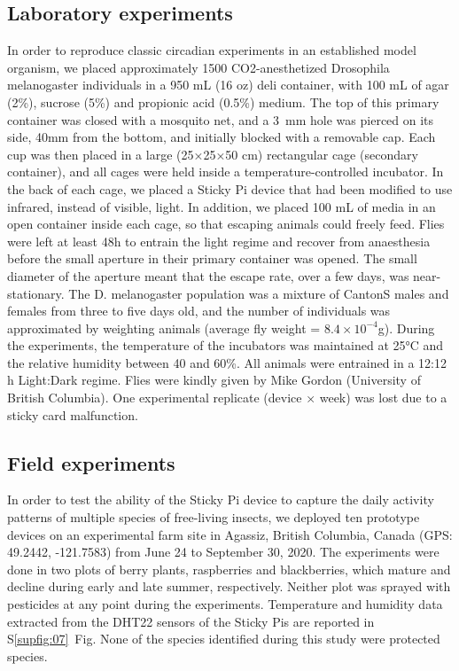 \documentclass[12pt]{article}
\begin{document}
\begin{linenumbers}
		\subsection*{Laboratory experiments}
		In order to reproduce classic circadian experiments in an established model organism, we placed approximately 1500 CO2-anesthetized Drosophila melanogaster individuals in a 950 mL (16 oz) deli container, with 100 mL of agar (2\%), sucrose (5\%) and propionic acid (0.5\%) medium. The top of this primary container was closed with a mosquito net, and a 3~mm hole was pierced on its side, 40mm from the bottom, and initially blocked with a removable cap. Each cup was then placed in a large (25×25×50 cm) rectangular cage (secondary container), and all cages were held inside a temperature-controlled incubator. In the back of each cage, we placed a Sticky Pi device that had been modified to use infrared, instead of visible, light. In addition, we placed 100 mL of media in an open container inside each cage, so that escaping animals could freely feed. Flies were left at least 48h to entrain the light regime and recover from anaesthesia before the small aperture in their primary container was opened. The small diameter of the aperture meant that the escape rate, over a few days, was near-stationary.
		The D. melanogaster population was a mixture of CantonS males and females from three to five days old, and the number of individuals was approximated by weighting animals (average fly weight = $8.4×10^{-4}$g). During the experiments, the temperature of the incubators was maintained at 25°C and the relative humidity between 40 and 60\%. All animals were entrained in a 12:12 h Light:Dark regime. Flies were kindly given by Mike Gordon (University of British Columbia). One experimental replicate (device × week) was lost due to a sticky card malfunction.
		
		\subsection*{Field experiments}
		In order to test the ability of the Sticky Pi device to capture the daily activity patterns of multiple species of free-living insects, we deployed ten prototype devices on an experimental farm site in Agassiz, British Columbia, Canada (GPS: 49.2442, -121.7583) from June 24 to September 30, 2020. The experiments were done in two plots of berry plants, raspberries and blackberries, which mature and decline during early and late summer, respectively. Neither plot was sprayed with pesticides at any point during the experiments.
		Temperature and humidity data extracted from the DHT22 sensors of the Sticky Pis are reported in S\ref{supfig:07}~Fig.
		None of the species identified during this study were protected species.
		

\end{linenumbers}
\end{document}
